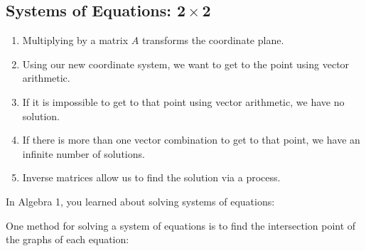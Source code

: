 \documentclass{article}
\begin{document}
\subsection*{Systems of Equations: $\mathbf{2 \times 2}$}

\begin{tcolorbox}[colframe=orange!70!white, coltitle=black, title=\textbf{Summary}]
\begin{enumerate}
    \item Multiplying by a matrix $A$ transforms the coordinate plane.
    \item Using our new coordinate system, we want to get to the point using vector arithmetic.
    \item If it is impossible to get to that point using vector arithmetic, we have no solution.
    \item If there is more than one vector combination to get to that point, we have an infinite number of solutions.
    \item Inverse matrices allow us to find the solution via a process.
\end{enumerate}
\end{tcolorbox}
\vfill

In Algebra 1, you learned about solving systems of equations:
\begin{center}
\end{center}
\vspace{1.5in}

One method for solving a system of equations is to find the intersection point of the graphs of each equation:
\begin{center}
\end{center}
\end{document}
